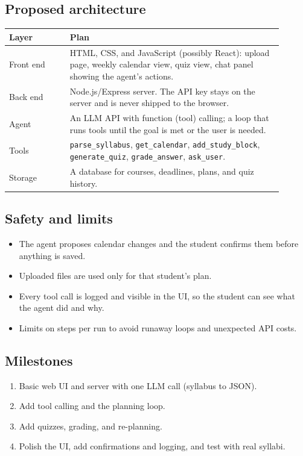 \documentclass[11pt]{article}
\begin{document}
\subsection{Proposed architecture}
\begin{center}
\begin{tabular}{@{}p{0.2\linewidth}p{0.7\linewidth}@{}}
\toprule
\textbf{Layer} & \textbf{Plan} \\
\midrule
Front end & HTML, CSS, and JavaScript (possibly React): upload page, weekly
calendar view, quiz view, chat panel showing the agent's actions. \\
Back end & Node.js/Express server. The API key stays on the server and is never
shipped to the browser. \\
Agent & An LLM API with function (tool) calling; a loop that runs tools until the
goal is met or the user is needed. \\
Tools & \texttt{parse\_syllabus}, \texttt{get\_calendar}, \texttt{add\_study\_block},
\texttt{generate\_quiz}, \texttt{grade\_answer}, \texttt{ask\_user}. \\
Storage & A database for courses, deadlines, plans, and quiz history. \\
\bottomrule
\end{tabular}
\end{center}

\subsection{Safety and limits}
\begin{itemize}
  \item The agent proposes calendar changes and the student confirms them before
        anything is saved.
  \item Uploaded files are used only for that student's plan.
  \item Every tool call is logged and visible in the UI, so the student can see what
        the agent did and why.
  \item Limits on steps per run to avoid runaway loops and unexpected API costs.
\end{itemize}

\subsection{Milestones}
\begin{enumerate}
  \item Basic web UI and server with one LLM call (syllabus to JSON).
  \item Add tool calling and the planning loop.
  \item Add quizzes, grading, and re-planning.
  \item Polish the UI, add confirmations and logging, and test with real syllabi.
\end{enumerate}
\end{document}
